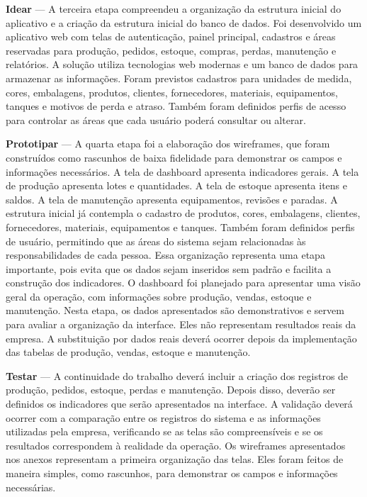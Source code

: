 \documentclass[12pt,a4paper]{article}
\begin{document}
\textbf{Idear} — A terceira etapa compreendeu a organização da estrutura inicial do aplicativo e a criação da estrutura inicial do banco de dados. Foi desenvolvido um aplicativo web com telas de autenticação, painel principal, cadastros e áreas reservadas para produção, pedidos, estoque, compras, perdas, manutenção e relatórios. A solução utiliza tecnologias web modernas e um banco de dados para armazenar as informações. Foram previstos cadastros para unidades de medida, cores, embalagens, produtos, clientes, fornecedores, materiais, equipamentos, tanques e motivos de perda e atraso. Também foram definidos perfis de acesso para controlar as áreas que cada usuário poderá consultar ou alterar.

\textbf{Prototipar} — A quarta etapa foi a elaboração dos wireframes, que foram construídos como rascunhos de baixa fidelidade para demonstrar os campos e informações necessários. A tela de dashboard apresenta indicadores gerais. A tela de produção apresenta lotes e quantidades. A tela de estoque apresenta itens e saldos. A tela de manutenção apresenta equipamentos, revisões e paradas. A estrutura inicial já contempla o cadastro de produtos, cores, embalagens, clientes, fornecedores, materiais, equipamentos e tanques. Também foram definidos perfis de usuário, permitindo que as áreas do sistema sejam relacionadas às responsabilidades de cada pessoa. Essa organização representa uma etapa importante, pois evita que os dados sejam inseridos sem padrão e facilita a construção dos indicadores. O dashboard foi planejado para apresentar uma visão geral da operação, com informações sobre produção, vendas, estoque e manutenção. Nesta etapa, os dados apresentados são demonstrativos e servem para avaliar a organização da interface. Eles não representam resultados reais da empresa. A substituição por dados reais deverá ocorrer depois da implementação das tabelas de produção, vendas, estoque e manutenção.

\textbf{Testar} — A continuidade do trabalho deverá incluir a criação dos registros de produção, pedidos, estoque, perdas e manutenção. Depois disso, deverão ser definidos os indicadores que serão apresentados na interface. A validação deverá ocorrer com a comparação entre os registros do sistema e as informações utilizadas pela empresa, verificando se as telas são compreensíveis e se os resultados correspondem à realidade da operação. Os wireframes apresentados nos anexos representam a primeira organização das telas. Eles foram feitos de maneira simples, como rascunhos, para demonstrar os campos e informações necessárias.
\end{document}
